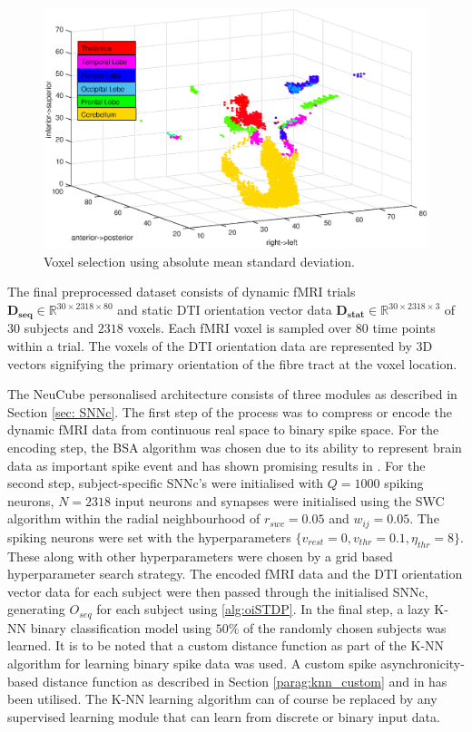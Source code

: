 \begin{figure}
	\centering
	\includegraphics[width=\linewidth]{fig/fmridti//selectedvoxelsroi.eps}
	\caption{Voxel selection using absolute mean standard deviation.}
	\label{fig:vox_sel}
\end{figure}
The final preprocessed dataset consists of dynamic fMRI trials $\mathbf{D_{seq}} \in \mathbb{R}^{30\times 2318 \times 80}$ and static DTI orientation vector data $\mathbf{D_{stat}} \in \mathbb{R}^{30\times 2318 \times 3}$ of $30$ subjects and $2318$ voxels. Each fMRI voxel is sampled over $80$ time points within a trial. The voxels of the DTI orientation data are represented by 3D vectors signifying the primary orientation of the fibre tract at the voxel location.     

The NeuCube personalised architecture consists of three modules as described in Section \ref{sec: SNNc}. The first step of the process was to compress or encode the dynamic fMRI data from continuous real space to binary spike space. For the encoding step, the BSA \citep{schrauwen2003bsa} algorithm was chosen due to its ability to represent brain data as important spike event and has shown promising results in \citep{sengupta2017spike,nuntalid2011eeg}. For the second step, subject-specific SNNc's were initialised with $Q=1000$ spiking neurons, $N=2318$ input neurons and synapses were initialised using the SWC algorithm within the radial neighbourhood of $r_{swc}=0.05$ and $w_{ij}=0.05$. The spiking neurons were set with the hyperparameters $\{v_{rest}=0, v_{thr}=0.1, \eta_{thr}=8\}$. These along with other hyperparameters were chosen by a grid based hyperparameter search strategy. The encoded fMRI data and the DTI orientation vector data for each subject were then passed through the initialised SNNc, generating $O_{seq}$ for each subject using \algorithmname \ref{alg:oiSTDP}. In the final step, a lazy K-NN binary classification model using $50\%$ of the randomly chosen subjects was learned. It is to be noted that a custom distance function as part of the K-NN algorithm for learning binary spike data was used. A custom spike asynchronicity-based distance function as described in Section \ref{parag:knn_custom} and in \citep{sengupta2017spike} has been utilised. The K-NN learning algorithm can of course be replaced by any supervised learning module that can learn from discrete or binary input data.           

